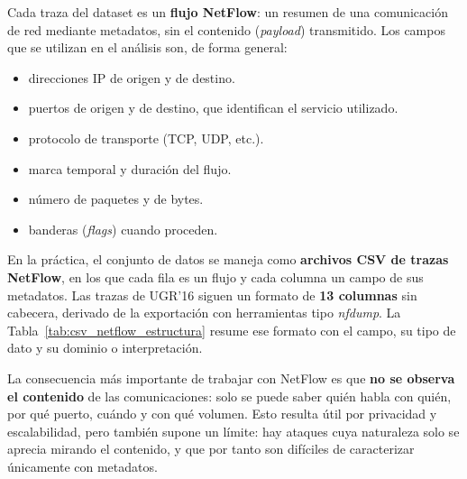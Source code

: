 Cada traza del dataset es un \textbf{flujo NetFlow}: un resumen de una comunicación de red mediante metadatos, sin el contenido (\emph{payload}) transmitido. Los campos que se utilizan en el análisis son, de forma general:

\begin{itemize}
  \item direcciones IP de origen y de destino.
  \item puertos de origen y de destino, que identifican el servicio utilizado.
  \item protocolo de transporte (TCP, UDP, etc.).
  \item marca temporal y duración del flujo.
  \item número de paquetes y de bytes.
  \item banderas (\emph{flags}) cuando proceden.
\end{itemize}

En la práctica, el conjunto de datos se maneja como \textbf{archivos CSV de trazas NetFlow}, en los que cada fila es un flujo y cada columna un campo de sus metadatos. Las trazas de UGR'16 siguen un formato de \textbf{13 columnas} sin cabecera, derivado de la exportación con herramientas tipo \emph{nfdump}. La Tabla~\ref{tab:csv_netflow_estructura} resume ese formato con el campo, su tipo de dato y su dominio o interpretación.

La consecuencia más importante de trabajar con NetFlow es que \textbf{no se observa el contenido} de las comunicaciones: solo se puede saber quién habla con quién, por qué puerto, cuándo y con qué volumen. Esto resulta útil por privacidad y escalabilidad, pero también supone un límite: hay ataques cuya naturaleza solo se aprecia mirando el contenido, y que por tanto son difíciles de caracterizar únicamente con metadatos.

